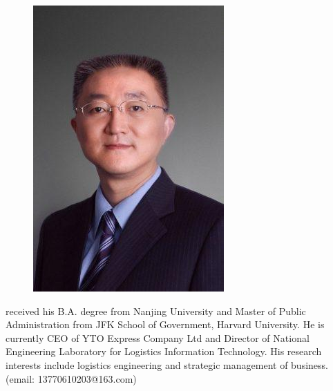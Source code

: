 \documentclass[letterpaper,12pt]{article}
\begin{document}
\begin{figure}[ht!]
	\includegraphics[width=1 in]{figures/feng} 
\end{figure}
 received his B.A. degree from Nanjing University and Master of Public Administration from JFK School of Government, Harvard University. He is currently CEO of YTO Express Company Ltd and Director of National Engineering Laboratory for Logistics Information Technology. His research interests include logistics engineering and strategic management of business.(email: 13770610203@163.com)
\end{document}
